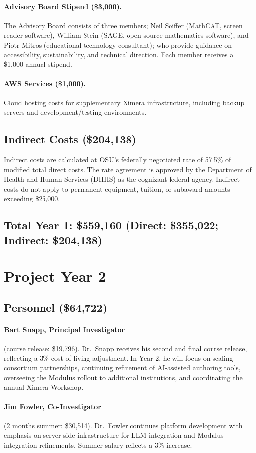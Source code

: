 \documentclass[12pt,letterpaper]{article}
\newcommand{\budgetyear}[1]{\section{Project Year #1}}
\newcommand{\budgetcat}[1]{\subsection*{#1}}
\begin{document}
\paragraph{Advisory Board Stipend (\$3,000).} The Advisory Board consists of three members; Neil Soiffer (MathCAT, screen reader software), William Stein (SAGE, open-source mathematics software), and Piotr Mitros (educational technology consultant); who provide guidance on accessibility, sustainability, and technical direction. Each member receives a \$1,000 annual stipend.

\paragraph{AWS Services (\$1,000).} Cloud hosting costs for supplementary Ximera infrastructure, including backup servers and development/testing environments.

\budgetcat{Indirect Costs (\$204,138)}

Indirect costs are calculated at OSU's federally negotiated rate of 57.5\% of modified total direct costs. The rate agreement is approved by the Department of Health and Human Services (DHHS) as the cognizant federal agency. Indirect costs do not apply to permanent equipment, tuition, or subaward amounts exceeding \$25,000.




\budgetcat{Total Year 1: \$559,160 (Direct: \$355,022; Indirect: \$204,138)}

\budgetyear{2}
\budgetcat{Personnel (\$64,722)}

\paragraph{Bart Snapp, Principal Investigator} (course release: \$19,796). Dr.\ Snapp receives his second and final course release, reflecting a 3\% cost-of-living adjustment. In Year 2, he will focus on scaling consortium partnerships, continuing refinement of AI-assisted authoring tools, overseeing the Modulus rollout to additional institutions, and coordinating the annual Ximera Workshop.

\paragraph{Jim Fowler, Co-Investigator} (2 months summer: \$30,514). Dr.\ Fowler continues platform development with emphasis on server-side infrastructure for LLM integration and Modulus integration refinements. Summer salary reflects a 3\% increase.
\end{document}
